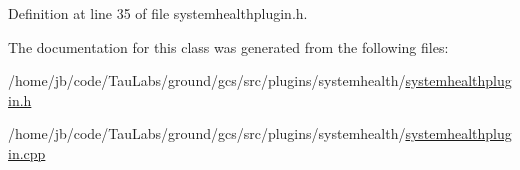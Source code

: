 \-Definition at line 35 of file systemhealthplugin.\-h.



\-The documentation for this class was generated from the following files\-:\begin{DoxyCompactItemize}
\item 
/home/jb/code/\-Tau\-Labs/ground/gcs/src/plugins/systemhealth/\hyperlink{systemhealthplugin_8h}{systemhealthplugin.\-h}\item 
/home/jb/code/\-Tau\-Labs/ground/gcs/src/plugins/systemhealth/\hyperlink{systemhealthplugin_8cpp}{systemhealthplugin.\-cpp}\end{DoxyCompactItemize}
